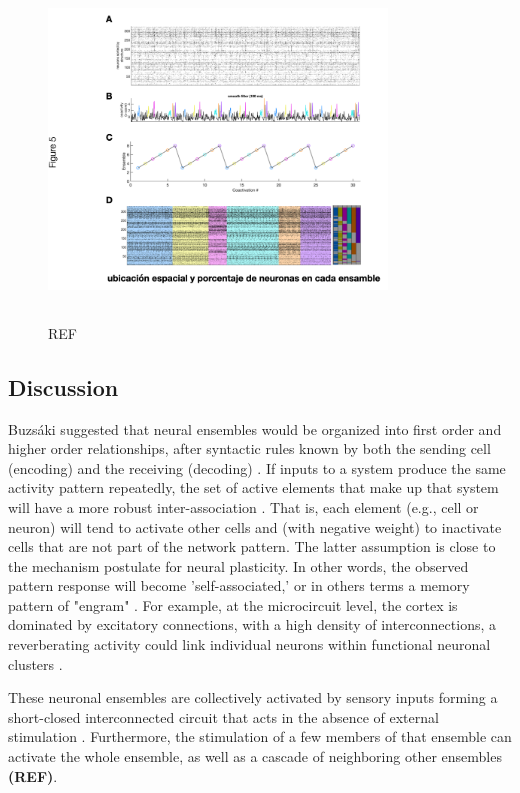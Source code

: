 \documentclass[9pt,twocolumn,twoside,lineno]{pnas-new}
\begin{document}
\begin{figure}
\centering
\includegraphics[width=9cm,height=9cm]{Fig 5.png}
\caption{REF}
\label{fig:Figure_5.pdf}
\end{figure}


\subsection*{Discussion}
Buzsáki suggested that neural ensembles would be organized into first order and higher order relationships, after syntactic rules known by both the sending cell (encoding) and the receiving (decoding) \citep{Buzsaki:2010jh}. If inputs to a system produce the same activity pattern repeatedly, the set of active elements that make up that system will have a more robust inter-association \citep{Buzsaki:2004bi}. That is, each element (e.g., cell or neuron) will tend to activate other cells and (with negative weight) to inactivate cells that are not part of the network pattern. The latter assumption is close to the mechanism postulate for neural plasticity. In other words, the observed pattern response will become 'self-associated,' or in others terms a memory pattern of "engram" \citep{Hebb:1961vs}. For example, at the microcircuit level, the cortex is dominated by excitatory connections, with a high density of interconnections, a reverberating activity could link individual neurons within functional neuronal clusters \citep{RN3482}.

 These neuronal ensembles are collectively activated by sensory inputs forming a short-closed interconnected circuit that acts in the absence of external stimulation \citep{RN3487}. Furthermore, the stimulation of a few members of that ensemble can activate the whole ensemble, as well as a cascade of neighboring other ensembles\textbf{ (REF)}.
\end{document}
